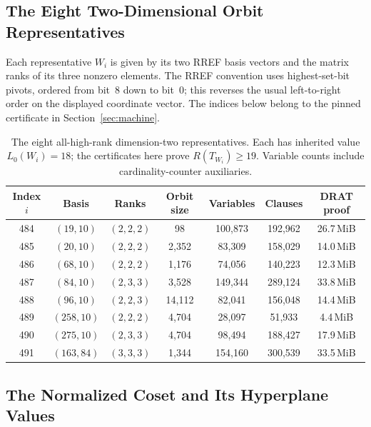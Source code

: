 \documentclass[11pt,a4paper]{article}
\begin{document}
\subsection{The Eight Two-Dimensional Orbit Representatives}

Each representative $W_i$ is given by its two RREF basis vectors and the matrix ranks of its three nonzero elements. The RREF convention uses highest-set-bit pivots, ordered from bit~8 down to bit~0; this reverses the usual left-to-right order on the displayed coordinate vector. The indices below belong to the pinned certificate in Section~\ref{sec:machine}.

\begin{table}[H]
\centering
\caption{The eight all-high-rank dimension-two representatives. Each has inherited value $L_0(W_i)=18$; the certificates here prove $R(T_{W_i})\ge19$. Variable counts include cardinality-counter auxiliaries.}
\label{tab:dim2}
\begin{tabular}{ccccccc}
\toprule
Index $i$ & Basis & Ranks & Orbit size & Variables & Clauses & DRAT proof \\
\midrule
484 & $(19,10)$  & $(2,2,2)$ &    98 & 100{,}873 & 192{,}962 & 26.7\,MiB \\
485 & $(20,10)$  & $(2,2,2)$ & 2{,}352 &  83{,}309 & 158{,}029 & 14.0\,MiB \\
486 & $(68,10)$  & $(2,2,2)$ & 1{,}176 &  74{,}056 & 140{,}223 & 12.3\,MiB \\
487 & $(84,10)$  & $(2,3,3)$ & 3{,}528 & 149{,}344 & 289{,}124 & 33.8\,MiB \\
488 & $(96,10)$  & $(2,2,3)$ & 14{,}112 &  82{,}041 & 156{,}048 & 14.4\,MiB \\
489 & $(258,10)$ & $(2,2,2)$ & 4{,}704 &  28{,}097 &  51{,}933 &  4.4\,MiB \\
490 & $(275,10)$ & $(2,3,3)$ & 4{,}704 &  98{,}494 & 188{,}427 & 17.9\,MiB \\
491 & $(163,84)$ & $(3,3,3)$ & 1{,}344 & 154{,}160 & 300{,}539 & 33.5\,MiB \\
\bottomrule
\end{tabular}
\end{table}

\subsection{The Normalized Coset and Its Hyperplane Values}
\end{document}
